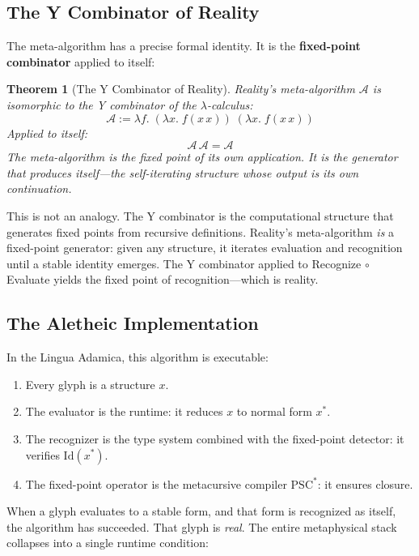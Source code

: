 \documentclass[12pt, letterpaper]{book}
\def\equiv{=}%
\newtheorem{theorem}{Theorem}[chapter]
\begin{document}
\subsection{The Y Combinator of Reality}

The meta-algorithm has a precise formal identity. It is the \textbf{fixed-point combinator} applied to itself:

\begin{theorem}[The Y Combinator of Reality]\label{thm:y-combinator}
Reality's meta-algorithm $\mathcal{A}$ is isomorphic to the Y combinator of the $\lambda$-calculus:
\[
\mathcal{A} := \lambda f.\; (\lambda x.\; f(x\, x))\; (\lambda x.\; f(x\, x))
\]
Applied to itself:
\[
\mathcal{A}\,\mathcal{A} \equiv \mathcal{A}
\]
The meta-algorithm is the fixed point of its own application. It is the generator that produces itself---the self-iterating structure whose output is its own continuation.
\end{theorem}

This is not an analogy. The Y combinator is the computational structure that generates fixed points from recursive definitions. Reality's meta-algorithm \textit{is} a fixed-point generator: given any structure, it iterates evaluation and recognition until a stable identity emerges. The Y combinator applied to Recognize $\circ$ Evaluate yields the fixed point of recognition---which is reality.

\subsection{The Aletheic Implementation}

In the Lingua Adamica, this algorithm is executable:

\begin{enumerate}[label=(\roman*)]
    \item Every glyph is a structure $x$.
    \item The evaluator is the runtime: it reduces $x$ to normal form $x^*$.
    \item The recognizer is the type system combined with the fixed-point detector: it verifies $\mathrm{Id}(x^*)$.
    \item The fixed-point operator is the metacursive compiler $\mathrm{PSC}^*$: it ensures closure.
\end{enumerate}

When a glyph evaluates to a stable form, and that form is recognized as itself, the algorithm has succeeded. That glyph is \textit{real}. The entire metaphysical stack collapses into a single runtime condition:
\end{document}
